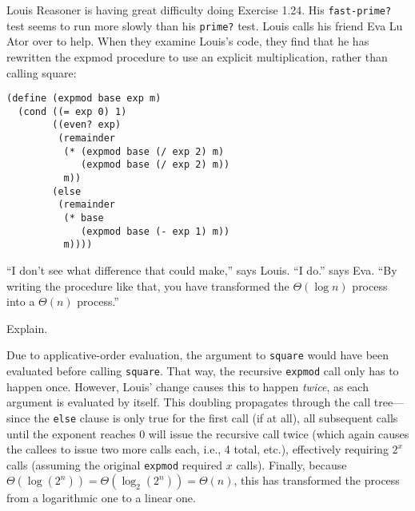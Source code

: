 \documentclass{sicp}
\date{August 26, 2024}
\begin{document}
\maketitle

\begin{displayquote}
	Louis Reasoner is having great difficulty doing Exercise 1.24.
	His \texttt{fast-prime?} test seems to run more slowly than his \texttt{prime?} test.
	Louis calls his friend Eva Lu Ator over to help.
	When they examine Louis’s code, they find that he has rewritten the expmod procedure to use an explicit multiplication, rather than calling square:

	\begin{lstlisting}
(define (expmod base exp m)
  (cond ((= exp 0) 1)
        ((even? exp)
         (remainder
          (* (expmod base (/ exp 2) m)
             (expmod base (/ exp 2) m))
          m))
        (else
         (remainder 
          (* base 
             (expmod base (- exp 1) m))
          m))))
  \end{lstlisting}
	“I don’t see what difference that could make,” says Louis. “I do.” says Eva. “By writing the procedure like that, you have transformed the $\Theta(\log n)$ process into a $\Theta(n)$ process.”

	Explain.
\end{displayquote}

Due to applicative-order evaluation, the argument to \texttt{square} would have been evaluated before calling \texttt{square}.
That way, the recursive \texttt{expmod} call only has to happen once.
However, Louis' change causes this to happen \emph{twice}, as each argument is evaluated by itself.
This doubling propagates through the call tree---since the \texttt{else} clause is only true for the first call (if at all), all subsequent calls until the exponent reaches 0 will issue the recursive call twice (which again causes the callees to issue two more calls each, i.e., 4 total, etc.), effectively requiring $2^x$ calls (assuming the original \texttt{expmod} required $x$ calls).
Finally, because $\Theta(\log(2^n)) = \Theta(\log_2(2^n)) = \Theta(n)$, this has transformed the process from a logarithmic one to a linear one.
\end{document}
